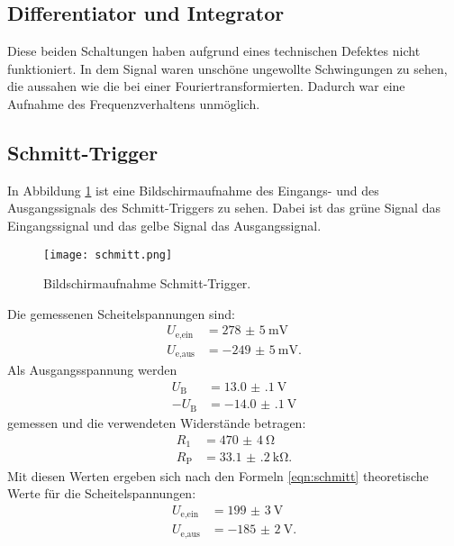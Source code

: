 \documentclass[
  bibliography=totoc,     %
  captions=tableheading,  %
  titlepage=firstiscover, %
]{scrartcl}
\begin{document}
\subsection{Differentiator und Integrator}
Diese beiden Schaltungen haben aufgrund eines technischen Defektes nicht funktioniert.
In dem Signal waren unschöne ungewollte Schwingungen zu sehen, die aussahen wie die
bei einer Fouriertransformierten. Dadurch war eine Aufnahme des Frequenzverhaltens unmöglich.

\subsection{Schmitt-Trigger}
In Abbildung \ref{fig:schmitttrigg} ist eine Bildschirmaufnahme des Eingangs- und
des Ausgangssignals des Schmitt-Triggers zu sehen. Dabei ist das grüne Signal das Eingangssignal
und das gelbe Signal das Ausgangssignal.
\begin{figure}[H]
  \centering
  \texttt{[image: schmitt.png]}
  \caption{Bildschirmaufnahme Schmitt-Trigger.}
  \label{fig:schmitttrigg}
\end{figure}
\noindent
Die gemessenen Scheitelspannungen sind:
\begin{align*}
  U_\text{e,ein} &= \SI{278(5)}{\milli\volt} \\
  U_\text{e,aus} &= \SI{-249(5)}{\milli\volt}.
\end{align*}
Als Ausgangsspannung werden
\begin{align*}
  U_\text{B} &= \SI{13.0(1)}{\volt} \\
  -U_\text{B} &= \SI{-14.0(1)}{\volt}
\end{align*}
gemessen und die verwendeten Widerstände betragen:
\begin{align*}
  R_1 &= \SI{470(4)}{\ohm} \\
  R_\text{P} &= \SI{33.1(2)}{\kilo\ohm}.
\end{align*}
Mit diesen Werten ergeben sich nach den Formeln \eqref{eqn:schmitt} theoretische
Werte für die Scheitelspannungen:
\begin{align*}
  U_\text{e,ein} &= \SI{199(3)}{\volt} \\
  U_\text{e,aus} &= \SI{-185(2)}{\volt}.
\end{align*}
\end{document}
